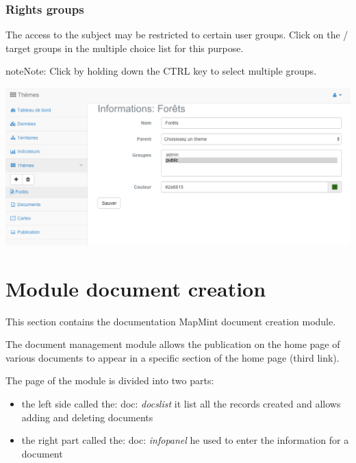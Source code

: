 \documentclass[letterpaper,10pt,english]{sphinxmanual}
\begin{document}
\subsection{Rights groups}
\label{themes/infopanel:droits-des-groupes}
The access to the subject may be restricted to certain user groups. Click on the / target groups in the multiple choice list for this purpose.

\begin{notice}{note}{Note:}
Click by holding down the CTRL key to select multiple groups.
\end{notice}

\includegraphics[width=1.000\linewidth]{theme-module-preview.png}


\chapter{Module document creation}
\label{documents/index:module-de-creation-de-documents}\label{documents/index:documents}\label{documents/index::doc}
This section contains the documentation MapMint document creation module.

The document management module allows the publication on the home page of various documents to appear in a specific section of the home page (third link).

The page of the module is divided into two parts:
\begin{itemize}
\item {} 
the left side called the: doc: \emph{docslist} it list all the records created and allows adding and deleting documents

\item {} 
the right part called the: doc: \emph{infopanel} he used to enter the information for a document

\end{itemize}
\end{document}

